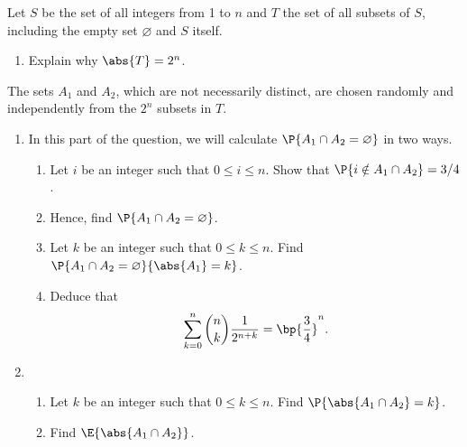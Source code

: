 \begin{problem}
    Let $S$ be the set of all integers from 1 to $n$ and $T$ the set of all subsets of $S$, including the empty set $\varnothing$ and $S$ itself.

    \begin{enumerate}
        \item Explain why $\abs{T} = 2^n$.
    \end{enumerate}

    The sets $A_1$ and $A_2$, which are not necessarily distinct, are chosen randomly and independently from the $2^n$ subsets in $T$.

    \setcounter{enumi}{1}
    \begin{enumerate}
        \item In this part of the question, we will calculate $\P{A_1 \cap A_2 = \varnothing}$ in two ways.
        \begin{enumerate}
            \item Let $i$ be an integer such that $0 \leq i \leq n$. Show that $\P{i \notin A_1 \cap A_2} = 3/4$.
            \item Hence, find $\P{A_1 \cap A_2 = \varnothing}$.
            \item Let $k$ be an integer such that $0 \leq k \leq n$. Find $\P{A_1 \cap A_2 = \varnothing}{\abs{A_1} = k}$.
            \item Deduce that \[\sum_{k = 0}^n \binom{n}{k} \frac1{2^{n+k}} = \bp{\frac34}^n.\]
        \end{enumerate}
        \item \begin{enumerate}
            \item Let $k$ be an integer such that $0 \leq k \leq n$. Find $\P{\abs{A_1 \cap A_2} = k}$.
            \item Find $\E{\abs{A_1 \cap A_2}}$.
        \end{enumerate}
    \end{enumerate}
\end{problem}
